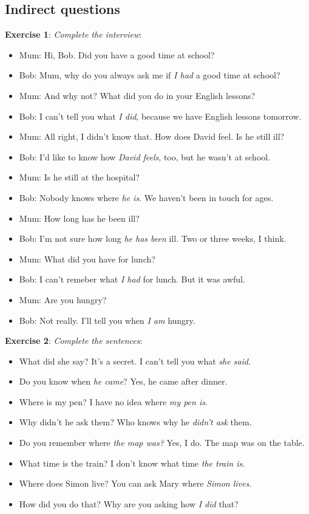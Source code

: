 \subsection{Indirect questions}

\textbf{Exercise 1}: \textit{Complete the interview}:

\begin{itemize}

\item Mum: Hi, Bob. Did you have a good time at school?
\item Bob: Mum, why do you always ask me if \textit{I had} a good time at school?
\item Mum: And why not? What did you do in your English lessons?
\item Bob: I can't tell you what \textit{I did}, because we have English lessons tomorrow.
\item Mum: All right, I didn't know that. How does David feel. Is he still ill?
\item Bob: I'd like to know how \textit{David feels}, too, but he wasn't at school.
\item Mum: Is he still at the hospital?
\item Bob: Nobody knows where \textit{he is}. We haven't been in touch for ages.
\item Mum: How long has he been ill?
\item Bob: I'm not sure how long \textit{he has been} ill. Two or three weeks, I think.
\item Mum: What did you have for lunch?
\item Bob: I can't remeber what \textit{I had} for lunch. But it was awful.
\item Mum: Are you hungry?
\item Bob: Not really. I'll tell you when \textit{I am} hungry.

\end{itemize}

\textbf{Exercise 2}: \textit{Complete the sentences}:

\begin{itemize}

\item What did she say? It's a secret. I can't tell you what \textit{she said}.
\item Do you know when \textit{he came}? Yes, he came after dinner.
\item Where is my pen? I have no idea where \textit{my pen is}.
\item Why didn't he ask them? Who knows why he \textit{didn't ask} them.
\item Do you remember where \textit{the map was?} Yes, I do. The map was on the table.
\item What time is the train? I don't know what time \textit{the train is}.
\item Where does Simon live? You can ask Mary where \textit{Simon lives}.
\item How did you do that? Why are you asking how \textit{I did} that?

\end{itemize}

